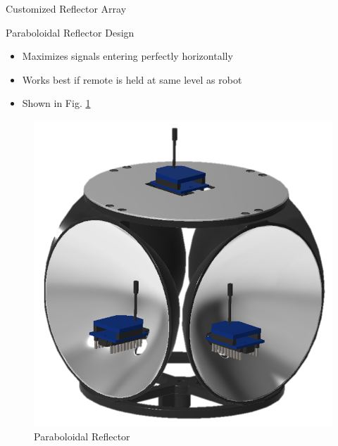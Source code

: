 \documentclass{beamer}
\begin{document}
\begin{frame}{Customized Reflector Array}
  \begin{block}{Paraboloidal Reflector Design}
    \begin{itemize}
      \item Maximizes signals entering perfectly horizontally
      \item Works best if remote is held at same level as robot
      \item Shown in Fig. \ref{fig:reflectorDesign1}
    \end{itemize}
  \end{block}
  \begin{figure}
    \centering
    \includegraphics[height=0.5\textheight]{figs/img/paraboloidalReflector.png}
    \caption{Paraboloidal Reflector}
    \label{fig:reflectorDesign1}
  \end{figure}
\end{frame}
\end{document}
